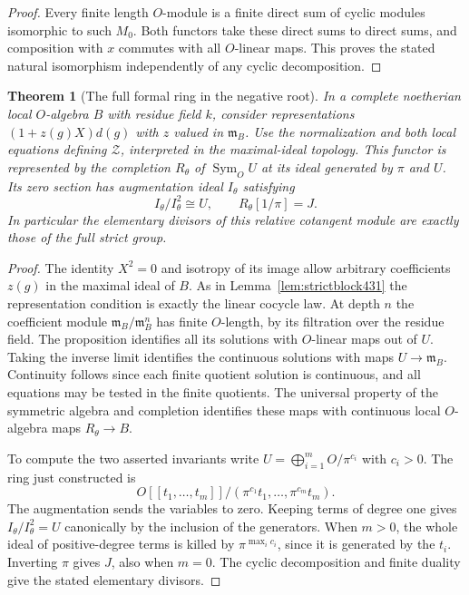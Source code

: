 \documentclass[a4paper,11pt]{article}
\newtheorem{theorem}[proposition]{Theorem}
\theoremstyle{definition}
\theoremstyle{remark}
\numberwithin{equation}{section}
\begin{document}
\begin{proof}
Every finite length \(O\)-module is a finite direct sum of
cyclic modules isomorphic to such \(M_0\). Both functors take
these direct sums to direct sums, and composition with \(x\)
commutes with all \(O\)-linear maps. This proves the stated
natural isomorphism independently of any cyclic decomposition.
\end{proof}

\begin{theorem}[The full formal ring in the negative root]\leavevmode
\label{thm:strictrootring434}
In a complete noetherian local \(O\)-algebra \(B\) with
residue field \(k\), consider representations
\((1+z(g)X)d(g)\) with \(z\) valued in \(\mathfrak m_B\).
Use the normalization and both local equations defining
\(\mathcal Z\), interpreted in the maximal-ideal topology.
This functor is represented by the completion \(R_\theta\)
of \(\operatorname{Sym}_O U\) at its ideal generated by
\(\pi\) and \(U\). Its zero section has augmentation ideal
\(I_\theta\) satisfying
\[
       I_\theta/I_\theta^2\cong U,\qquad
       R_\theta[1/\pi]=J .
\]
In particular the elementary divisors of this relative
cotangent module are exactly those of the full strict group.
\end{theorem}
\begin{proof}
The identity \(X^2=0\) and isotropy of its image allow
arbitrary coefficients \(z(g)\) in the maximal ideal of
\(B\). As in Lemma~\ref{lem:strictblock431} the representation
condition is exactly the linear cocycle law. At depth \(n\)
the coefficient module \(\mathfrak m_B/\mathfrak m_B^n\)
has finite \(O\)-length, by its filtration over the residue
field. The proposition identifies all its solutions with
\(O\)-linear maps out of \(U\). Taking the inverse limit
identifies the continuous solutions with maps
\(U\to\mathfrak m_B\). Continuity follows since each finite
quotient solution is continuous, and all equations may be
tested in the finite quotients. The universal property of
the symmetric algebra and completion identifies these maps
with continuous local \(O\)-algebra maps \(R_\theta\to B\).

To compute the two asserted invariants write
\(U=\bigoplus_{i=1}^m O/\pi^{c_i}\) with \(c_i>0\).
The ring just constructed is
\[
     O[[t_1,\ldots,t_m]]/
                (\pi^{c_1}t_1,\ldots,\pi^{c_m}t_m).
\]
The augmentation sends the variables to zero. Keeping terms
of degree one gives \(I_\theta/I_\theta^2=U\) canonically
by the inclusion of the generators. When \(m>0\), the whole
ideal of positive-degree terms is killed by
\(\pi^{\max_i c_i}\), since it is generated by the \(t_i\).
Inverting \(\pi\) gives \(J\), also when \(m=0\).
The cyclic decomposition and finite duality give the stated
elementary divisors.
\end{proof}
\end{document}
